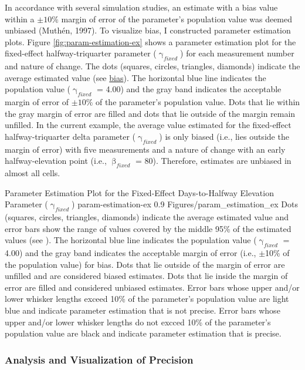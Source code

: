 \documentclass[
12pt, %
twoside,
english]{guelphthesis}
\theoremstyle{definition}
\theoremstyle{definition}
\theoremstyle{definition}
\theoremstyle{definition}
\theoremstyle{remark}
\begin{document}
In accordance with several simulation studies, an estimate with a bias value within a \(\pm10\%\) margin of error of the parameter's population value was deemed unbiased (Muthén, 1997). To visualize bias, I constructed parameter estimation plots. Figure \ref{fig:param-estimation-ex} shows a parameter estimation plot for the fixed-effect halfway-triquarter parameter (\(\upgamma_{fixed}\)) for each measurement number and nature of change. The dots (squares, circles, triangles, diamonds) indicate the average estimated value (see \protect\hyperlink{bias-comp}{bias}). The horizontal blue line indicates the population value (\(\upgamma_{fixed}\) = 4.00) and the gray band indicates the acceptable margin of error of \(\pm10\%\) of the parameter's population value. Dots that lie within the gray margin of error are filled and dots that lie outside of the margin remain unfilled. In the current example, the average value estimated for the fixed-effect halfway-triquarter delta parameter (\(\upgamma_{fixed}\)) is only biased (i.e., lies outside the margin of error) with five measurements and a nature of change with an early halfway-elevation point (i.e., \(\upbeta_{fixed}\) = 80). Therefore, estimates are unbiased in almost all cells.
\begin{apaFigure}
[portrait]
[-0.8cm]
{Parameter Estimation Plot for the Fixed-Effect Days-to-Halfway Elevation Parameter ($\upgamma_{fixed}$)}
{param-estimation-ex}
{0.9}
{Figures/param_estimation_ex}
{Dots (squares, circles, triangles, diamonds) indicate the average estimated value and error bars show the range of values covered by the middle 95\% of the estimated values (see ).  The horizontal blue line indicates the population value ($\upgamma_{fixed}$ = 4.00) and the gray band indicates the acceptable margin of error (i.e., $\pm$10\% of the population value) for bias. Dots that lie outside of the margin of error are unfilled and are considered biased estimates. Dots that lie inside the margin of error are filled and considered unbiased estimates. Error bars whose upper and/or lower whisker lengths exceed 10\% of the parameter's population value are light blue and indicate parameter estimation that is not precise. Error bars whose upper and/or lower whisker lengths do not excced 10\% of the parameter's population value are black and indicate parameter estimation that is precise.}
\end{apaFigure}
\hypertarget{precision-analysis}{%
\subsubsection{Analysis and Visualization of Precision}\label{precision-analysis}}
\end{document}
